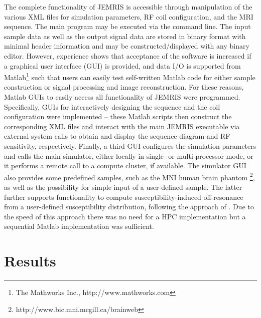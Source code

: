 \documentclass[journal,onecolumn,12pt]{IEEEtran}
\begin{document}
The complete functionality of JEMRIS is accessible through manipulation of the various XML files for simulation
parameters, RF coil configuration, and the MRI sequence. The main program may be executed via the command line. The
input sample data as well as the output signal data are stored in binary format with minimal header information and may
be constructed/displayed with any binary editor. However, experience shows that acceptance of the software is increased
if a graphical user interface (GUI) is provided, and data I/O is supported from Matlab\footnote{The Mathworks Inc., {\sf
    http://www.mathworks.com}} such that users can easily test self-written Matlab code for either sample construction
or signal processing and image reconstruction. For these reasons, Matlab GUIs to easily access all functionality of
JEMRIS were programmed. Specifically, GUIs for interactively designing the sequence and the coil configuration were
implemented -- these Matlab scripts then construct the corresponding XML files and interact with the main JEMRIS
executable via external system calls to obtain and display the sequence diagram and RF sensitivity,
respectively. Finally, a third GUI configures the simulation parameters and calls the main simulator, either locally in
single- or multi-processor mode, or it performs a remote call to a compute cluster, if available. The simulator GUI also
provides some predefined samples, such as the MNI human brain phantom \footnote{\sf
  http://www.bic.mni.mcgill.ca/brainweb}, as well as the possibility for simple input of a user-defined sample.  The
latter further supports functionality to compute susceptibility-induced off-resonance from a user-defined susceptibility
distribution, following the approach of \cite{marques}. Due to the speed of this approach there was no need for a HPC
implementation but a sequential Matlab implementation was sufficient.
\section{Results}
\end{document}
